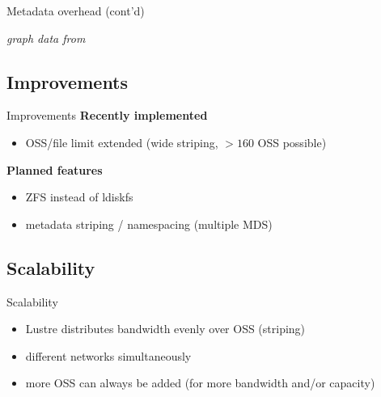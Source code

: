 \begin{frame}{Metadata overhead (cont'd)}
{
    }

    \vspace{1cm}
    \hfill{\scriptsize\emph{graph data from \cite{metadata-scaling}}}
\end{frame}

\subsection{Improvements}
\begin{frame}{Improvements}
    \textbf{Recently implemented}
    \begin{itemize}
        \item OSS/file limit extended (wide striping, $> 160$ OSS possible)
    \end{itemize}

    \textbf{Planned features}
    \begin{itemize}
        \item ZFS instead of ldiskfs
        \item metadata striping / namespacing (multiple MDS)
    \end{itemize}
\end{frame}

\subsection{Scalability}
\begin{frame}{Scalability}
    \begin{itemize}
        \item Lustre distributes bandwidth evenly over OSS (striping)
        \item different networks simultaneously
        \item more OSS can always be added (for more bandwidth and/or capacity)
    \end{itemize}
\end{frame}
